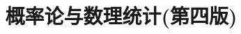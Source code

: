 \documentclass[a4paper]{article}
\theoremstyle{mystyle}
\begin{document}
	\title{\huge \heiti 概率论与数理统计(第四版)}
	\maketitle
	\setcounter{section}{1}
	
	
	
\end{document}
